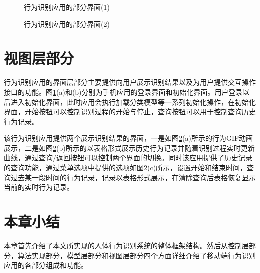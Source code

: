 \begin{figure}[htb]
    \centering
    \caption{行为识别应用的部分界面(1)}\label{screenshot1}
\end{figure}
\begin{figure}[htb]
    \centering
    \caption{行为识别应用的部分界面(2)}\label{screenshot2}
\end{figure}
\section{视图层部分}
\par 行为识别应用的界面层部分主要提供向用户展示识别结果以及为用户提供交互操作接口的功能。图\ref{screenshot1}(a)和(b)分别为手机应用的登录界面和初始化界面。用户登录以后进入初始化界面，此时应用会执行加载分类模型等一系列初始化操作，在初始化界面，开始按钮可以控制识别过程的开始与停止，查询按钮可以用于控制查询历史行为记录。
\par 该行为识别应用提供两个展示识别结果的界面，一是如图\ref{screenshot2}(a)所示的行为GIF动画展示，二是如图\ref{screenshot2}(b)所示的以表格形式展示历史行为记录并随着识别过程实时更新曲线，通过查询/返回按钮可以控制两个界面的切换。同时该应用提供了历史记录的查询功能，通过菜单选项中提供的选项如图\ref{screenshot2}(c)所示，设置开始和结束时间，查询过去某一段时间的行为记录，记录以表格形式展示，在清除查询后表格恢复显示当前的实时行为记录。

\section{本章小结}
\par 本章首先介绍了本文所实现的人体行为识别系统的整体框架结构。然后从控制层部分，算法实现部分，模型层部分和视图层部分四个方面详细介绍了移动端行为识别应用的各部分组成和功能。
